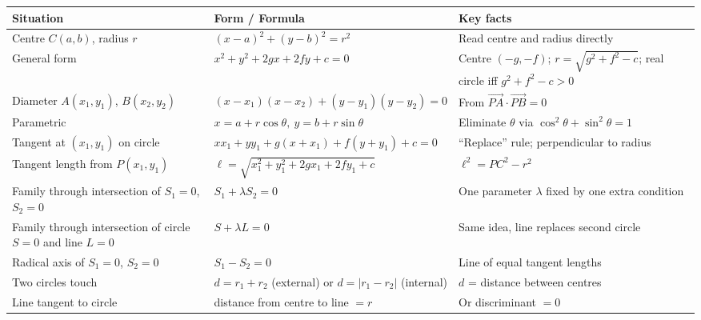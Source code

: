 \documentclass[11pt]{article}
\begin{document}
\begin{propriete}
\begin{center}
\begin{tabularx}{\linewidth}{|l|X|X|}
\hline
\rowcolor{popblueL} \textbf{Situation} & \textbf{Form / Formula} & \textbf{Key facts} \\
\hline
Centre $C(a,b)$, radius $r$ & $(x-a)^2+(y-b)^2=r^2$ & Read centre and radius directly \\
\hline
General form & $x^2+y^2+2gx+2fy+c=0$ & Centre $(-g,-f)$; $r=\sqrt{g^2+f^2-c}$; real circle iff $g^2+f^2-c>0$ \\
\hline
Diameter $A(x_1,y_1)$, $B(x_2,y_2)$ & $(x-x_1)(x-x_2)+(y-y_1)(y-y_2)=0$ & From $\vec{PA}\cdot\vec{PB}=0$ \\
\hline
Parametric & $x=a+r\cos\theta,\ y=b+r\sin\theta$ & Eliminate $\theta$ via $\cos^2\theta+\sin^2\theta=1$ \\
\hline
Tangent at $(x_1,y_1)$ on circle & $xx_1+yy_1+g(x+x_1)+f(y+y_1)+c=0$ & ``Replace'' rule; perpendicular to radius \\
\hline
Tangent length from $P(x_1,y_1)$ & $\ell=\sqrt{x_1^2+y_1^2+2gx_1+2fy_1+c}$ & $\ell^2=PC^2-r^2$ \\
\hline
Family through intersection of $S_1=0$, $S_2=0$ & $S_1+\lambda S_2=0$ & One parameter $\lambda$ fixed by one extra condition \\
\hline
Family through intersection of circle $S=0$ and line $L=0$ & $S+\lambda L=0$ & Same idea, line replaces second circle \\
\hline
Radical axis of $S_1=0$, $S_2=0$ & $S_1-S_2=0$ & Line of equal tangent lengths \\
\hline
Two circles touch & $d=r_1+r_2$ (external) or $d=|r_1-r_2|$ (internal) & $d$ = distance between centres \\
\hline
Line tangent to circle & distance from centre to line $=r$ & Or discriminant $=0$ \\
\hline
\end{tabularx}
\end{center}
\end{propriete}
\end{document}
